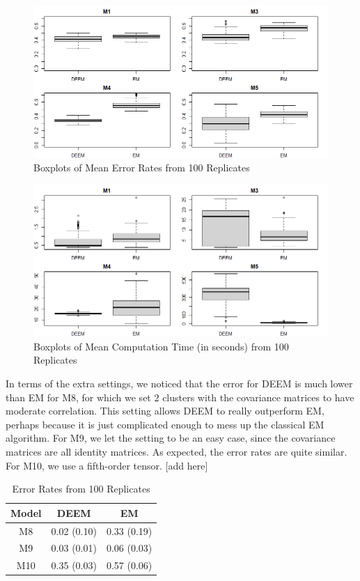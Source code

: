 \documentclass[11pt]{article}
\begin{document}
\begin{figure}[H]
    \centering
    \includegraphics[width = 16 cm]{sim_error.png}
    \caption{Boxplots of Mean Error Rates from 100 Replicates}
    \label{fig:err}
\end{figure}

\begin{figure}[H]
    \centering
    \includegraphics[width = 16 cm]{sim_time.png}
    \caption{Boxplots of Mean Computation Time (in seconds) from 100 Replicates}
    \label{fig:time}
\end{figure}

In terms of the extra settings, we noticed that the error for DEEM is much lower than EM for M8, for which we set $2$ clusters with the covariance matrices to have moderate correlation. This setting allows DEEM to really outperform EM, perhaps because it is just complicated enough to mess up the classical EM algorithm. For M9, we let the setting to be an easy case, since the covariance matrices are all identity matrices. As expected, the error rates are quite similar. For M10, we use a fifth-order tensor. [add here]

\begin{table}[H]
    \centering
    \begin{tabular}{c|cc}
       Model  &  DEEM & EM \\
       \hline
         M8 & 0.02 (0.10) & 0.33 (0.19) \\
         M9 &  0.03 (0.01) & 0.06 (0.03) \\
         M10 &  0.35 (0.03) & 0.57 (0.06) \\ 
    \end{tabular}
    \caption{Error Rates from 100 Replicates}
    \label{tab:err2}
\end{table}
\end{document}
